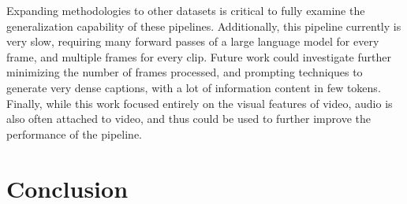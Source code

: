 \documentclass{article}
\begin{document}
Expanding methodologies to other datasets is critical to fully examine the generalization capability of these pipelines.
Additionally, this pipeline currently is very slow, requiring many forward passes of a large language model for every frame, and multiple frames for every clip.
Future work could investigate further minimizing the number of frames processed, and prompting techniques to generate very dense captions, with a lot of information content in few tokens.
Finally, while this work focused entirely on the visual features of video, audio is also often attached to video, and thus could be used to further improve the performance of the pipeline.

\section{Conclusion}



\end{document}
